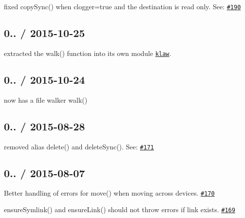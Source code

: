 \begin{DoxyItemize}
\item fixed {\ttfamily copy\+Sync()} when {\ttfamily clogger=true} and the destination is read only. See\+: \href{https://github.com/jprichardson/node-fs-extra/pull/190}{\tt \#190}
\end{DoxyItemize}

\subsection*{0.. / 2015-\/10-\/25 }


\begin{DoxyItemize}
\item extracted the {\ttfamily walk()} function into its own module \href{https://github.com/jprichardson/node-klaw}{\tt {\ttfamily klaw}}.
\end{DoxyItemize}

\subsection*{0.. / 2015-\/10-\/24 }


\begin{DoxyItemize}
\item now has a file walker {\ttfamily walk()}
\end{DoxyItemize}

\subsection*{0.. / 2015-\/08-\/28 }


\begin{DoxyItemize}
\item removed alias {\ttfamily delete()} and {\ttfamily delete\+Sync()}. See\+: \href{https://github.com/jprichardson/node-fs-extra/issues/171}{\tt \#171}
\end{DoxyItemize}

\subsection*{0.. / 2015-\/08-\/07 }


\begin{DoxyItemize}
\item Better handling of errors for {\ttfamily move()} when moving across devices. \href{https://github.com/jprichardson/node-fs-extra/pull/170}{\tt \#170}
\item {\ttfamily ensure\+Symlink()} and {\ttfamily ensure\+Link()} should not throw errors if link exists. \href{https://github.com/jprichardson/node-fs-extra/pull/169}{\tt \#169}
\end{DoxyItemize}

